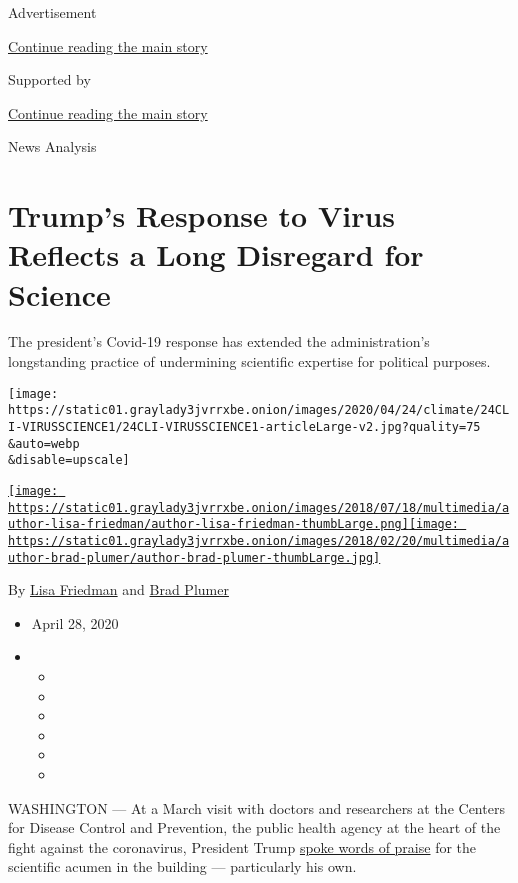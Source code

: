 Advertisement

\protect\hyperlink{after-top}{Continue reading the main story}

Supported by

\protect\hyperlink{after-sponsor}{Continue reading the main story}

News Analysis

\hypertarget{trumps-response-to-virus-reflects-a-long-disregard-for-science}{%
\section{Trump's Response to Virus Reflects a Long Disregard for
Science}\label{trumps-response-to-virus-reflects-a-long-disregard-for-science}}

The president's Covid-19 response has extended the administration's
longstanding practice of undermining scientific expertise for political
purposes.

\texttt{[image: https://static01.graylady3jvrrxbe.onion/images/2020/04/24/climate/24CLI-VIRUSSCIENCE1/24CLI-VIRUSSCIENCE1-articleLarge-v2.jpg?quality=75\\\&auto=webp\\\&disable=upscale]}

\href{https://www.nytimes3xbfgragh.onion/by/lisa-friedman}{\texttt{[image: https://static01.graylady3jvrrxbe.onion/images/2018/07/18/multimedia/author-lisa-friedman/author-lisa-friedman-thumbLarge.png]}}\href{https://www.nytimes3xbfgragh.onion/by/brad-plumer}{\texttt{[image: https://static01.graylady3jvrrxbe.onion/images/2018/02/20/multimedia/author-brad-plumer/author-brad-plumer-thumbLarge.jpg]}}

By \href{https://www.nytimes3xbfgragh.onion/by/lisa-friedman}{Lisa
Friedman} and
\href{https://www.nytimes3xbfgragh.onion/by/brad-plumer}{Brad Plumer}

\begin{itemize}
\item
  April 28, 2020
\item
  \begin{itemize}
  \item
  \item
  \item
  \item
  \item
  \item
  \end{itemize}
\end{itemize}

WASHINGTON --- At a March visit with doctors and researchers at the
Centers for Disease Control and Prevention, the public health agency at
the heart of the fight against the coronavirus, President Trump
\href{https://www.whitehouse.gov/briefings-statements/remarks-president-trump-tour-centers-disease-control-prevention-atlanta-ga/}{spoke
words of praise} for the scientific acumen in the building ---
particularly his own.

